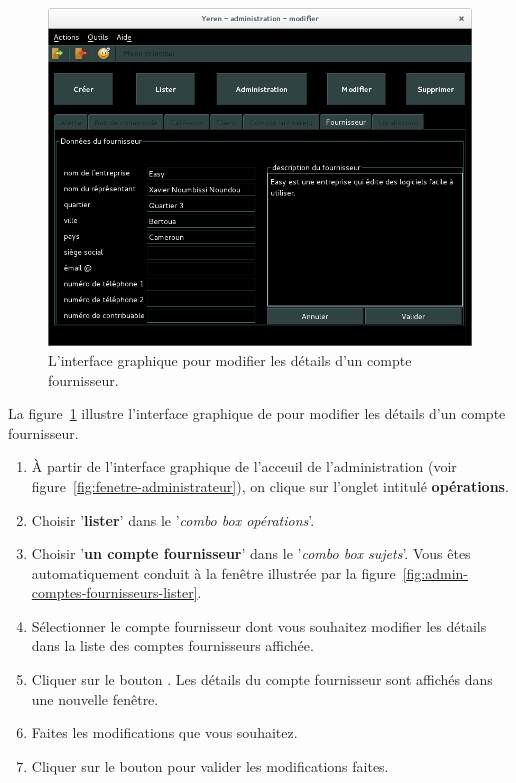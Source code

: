 \begin{figure}[!htpb]
	\centering
	\includegraphics[scale=0.45]{images/compte-fournisseur-modifier.png}
	\caption{L'interface graphique pour modifier les
			d\'etails d'un compte fournisseur.}
	\label{fig:admin-comptes-fournisseurs-modifier}
\end{figure}

La figure~\ref{fig:admin-comptes-fournisseurs-modifier} illustre
l'interface graphique de \yeren pour modifier les
d\'etails d'un compte fournisseur.

\begin{enumerate}[1)]
	\item \`A partir de l'interface graphique de l'acceuil de
		l'administration (voir figure~\ref{fig:fenetre-administrateur}),
		on clique sur l'onglet intitul\'e \textbf{op\'erations}. 
		
	\item Choisir '\textbf{lister}' dans le '\emph{combo box
		op\'erations}'.
		
	\item Choisir '\textbf{un compte fournisseur}' dans le '\emph{combo box
		sujets}'. Vous \^etes automatiquement conduit \`a la fen\^etre
		illustr\'ee par la figure~\ref{fig:admin-comptes-fournisseurs-lister}.
		
	\item S\'electionner le compte fournisseur dont vous souhaitez
		modifier les d\'etails dans la liste des comptes fournisseurs
		affich\'ee.
		
	\item Cliquer sur le bouton . Les d\'etails
		du compte fournisseur sont affich\'es dans une nouvelle fen\^etre.
		
	\item Faites les modifications que vous souhaitez.
		
	\item Cliquer sur le bouton  pour valider
		les modifications faites.
\end{enumerate}

